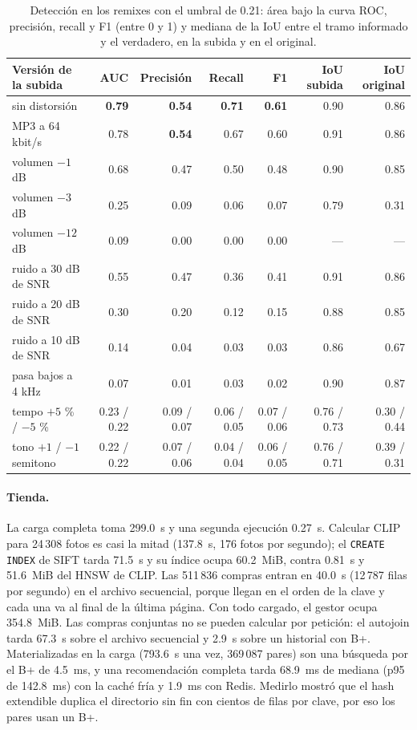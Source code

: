 \begin{table}[!htb]
\centering
\caption{Detección en los remixes con el umbral de 0.21: área bajo la curva ROC, precisión,
recall y F1 (entre 0 y 1) y mediana de la IoU entre el tramo informado y el verdadero, en la
subida y en el original.}\label{tab:copyright-eval}
\small
\begin{tabular}{@{}lrrrrrr@{}}
\toprule
\textbf{Versión de la subida} & \textbf{AUC} & \textbf{Precisión} & \textbf{Recall} & \textbf{F1} & \textbf{IoU subida} & \textbf{IoU original} \\
\midrule
sin distorsión & \textbf{0.79} & \textbf{0.54} & \textbf{0.71} & \textbf{0.61} & 0.90 & 0.86 \\
MP3 a 64 kbit/s & 0.78 & \textbf{0.54} & 0.67 & 0.60 & 0.91 & 0.86 \\
volumen $-1$ dB & 0.68 & 0.47 & 0.50 & 0.48 & 0.90 & 0.85 \\
volumen $-3$ dB & 0.25 & 0.09 & 0.06 & 0.07 & 0.79 & 0.31 \\
volumen $-12$ dB & 0.09 & 0.00 & 0.00 & 0.00 & --- & --- \\
ruido a 30 dB de SNR & 0.55 & 0.47 & 0.36 & 0.41 & 0.91 & 0.86 \\
ruido a 20 dB de SNR & 0.30 & 0.20 & 0.12 & 0.15 & 0.88 & 0.85 \\
ruido a 10 dB de SNR & 0.14 & 0.04 & 0.03 & 0.03 & 0.86 & 0.67 \\
pasa bajos a 4 kHz & 0.07 & 0.01 & 0.03 & 0.02 & 0.90 & 0.87 \\
tempo $+5$ \% / $-5$ \% & 0.23 / 0.22 & 0.09 / 0.07 & 0.06 / 0.05 & 0.07 / 0.06 & 0.76 / 0.73 & 0.30 / 0.44 \\
tono $+1$ / $-1$ semitono & 0.22 / 0.22 & 0.07 / 0.06 & 0.04 / 0.04 & 0.06 / 0.05 & 0.76 / 0.71 & 0.39 / 0.31 \\
\bottomrule
\end{tabular}
\end{table}

\paragraph{Tienda.} La carga completa toma 299.0~s y una segunda ejecución 0.27~s.
Calcular CLIP para 24\,308 fotos es casi la mitad (137.8~s, 176 fotos por segundo); el
\texttt{CREATE INDEX} de SIFT tarda 71.5~s y su índice ocupa 60.2~MiB, contra 0.81~s y
51.6~MiB del HNSW de CLIP. Las 511\,836 compras entran en 40.0~s (12\,787 filas por segundo)
en el archivo secuencial, porque llegan en el orden de la clave y cada una va al final de
la última página. Con todo cargado, el gestor ocupa 354.8~MiB. Las compras
conjuntas no se pueden calcular por petición: el autojoin tarda 67.3~s sobre el archivo
secuencial y 2.9~s sobre un historial con B+. Materializadas en la carga (793.6~s una vez,
369\,087 pares) son una búsqueda por el B+ de 4.5~ms, y una recomendación completa tarda
68.9~ms de mediana (p95 de 142.8~ms) con la caché fría y 1.9~ms con Redis. Medirlo
mostró que el hash extendible duplica el directorio sin fin con cientos de filas por clave,
por eso los pares usan un B+.

